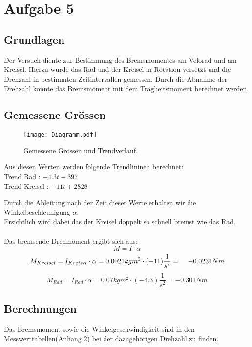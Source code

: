 \documentclass{article}
\begin{document}
\section{Aufgabe 5}

\subsection{Grundlagen}
Der Versuch diente zur Bestimmung des Bremsmomentes am Velorad und am Kreisel.
Hierzu wurde das Rad und der Kreisel in Rotation versetzt und die Drehzahl in bestimmten Zeitintervallen
gemessen. Durch die Abnahme der Drehzahl konnte das Bremsmoment mit dem Trägheitsmoment
berechnet werden.
\subsection{Gemessene Grössen}

\begin{figure}[H]
\texttt{[image: Diagramm.pdf]} 
\caption{Gemessene Grössen und Trendverlauf.}
\end{figure}
Aus diesen Werten werden folgende Trendlininen berechnet:\\
Trend Rad : \hspace{2cm}$-4.3t+397 $\\
Trend Kreisel : \hspace{1.58cm}$-11t+2828$

Durch die Ableitung nach der Zeit dieser Werte erhalten wir die Winkelbeschleunigung $\alpha$.\\
Ersichtlich wird dabei das der Kreisel doppelt so schnell bremst wie das Rad.\\\\
Das bremsende Drehmoment ergibt sich aus: 
\begin{equation}
M=I\cdot \alpha
\end{equation}
\begin{equation}
M_{Kreisel} = I_{Kreisel}\cdot \alpha = 0.0021kgm^2 \cdot (-11)\frac{1}{s^2} = \hspace{0.4cm}-0.0231Nm\\
\end{equation}
\begin{equation}
M_{Rad} = I_{Rad}\cdot \alpha= 0.07kgm^2 \cdot (-4.3)\frac{1}{s^2}  =  -0.301Nm
\end{equation}
\subsection{Berechnungen}
Das Bremsmoment sowie die Winkelgeschwindigkeit sind in den Messwerttabellen(Anhang 2) bei der dazugehörigen Drehzahl zu finden.
\end{document}

